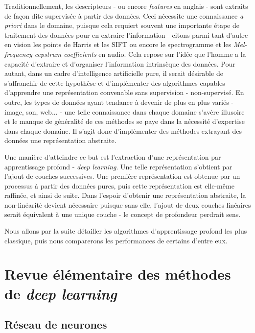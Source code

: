 \documentclass[10pt,a4paper]{article}
\begin{document}
Traditionnellement, les descripteurs - ou encore \emph{features} en anglais - sont extraits de façon dite supervisée à partir des données. Ceci nécessite une connaissance \emph{a priori} dans le domaine, puisque cela requiert souvent une importante étape de traitement des données pour en extraire l'information - citons parmi tant d'autre en vision les points de Harris et les SIFT ou encore le spectrogramme et les \emph{Mel-frequency cepstrum coefficients} en audio. Cela repose sur l'idée que l'homme a la capacité d'extraire et d'organiser l'information intrinsèque des données. Pour autant, dans un cadre d'intelligence artificielle pure, il serait désirable de s'affranchir de cette hypothèse et d'implémenter des algorithmes capables d'apprendre une représentation convenable sans supervision - non-supervisé. En outre, les types de données ayant tendance à devenir de plus en plus variés - image, son, web... - une telle connaissance dans chaque domaine s'avère illusoire et le manque de généralité de ces méthodes se paye dans la nécessité d'expertise dans chaque domaine. Il s'agit donc d'implémenter des méthodes extrayant des données une représentation abstraite.

Une manière d'atteindre ce but est l'extraction d'une représentation par apprentissage profond - \emph{deep learning}. Une telle représentation s'obtient par l'ajout de couches successives. Une première représentation est obtenue par un processus à partir des données pures, puis cette représentation est elle-même raffinée, et ainsi de suite. Dans l'espoir d'obtenir une représentation abstraite, la non-linéarité devient nécessaire puisque sans elle, l'ajout de deux couches linéaires serait équivalent à une unique couche - le concept de profondeur perdrait sens.

Nous allons par la suite détailler les algorithmes d'apprentissage profond les plus classique, puis nous comparerons les performances de certains d'entre eux. 







\section{Revue élémentaire des méthodes de \emph{deep learning}}

\subsection{Réseau de neurones}
\end{document}
